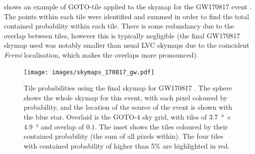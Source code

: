 \begin{colsection}
\begin{colsection}
\newpage

 shows an example of GOTO-tile applied to the skymap for the GW170817 event \citep{GW170817}. The points within each tile were identified and summed in order to find the total contained probability within each tile. There is some redundancy due to the overlap between tiles, however this is typically negligible (the final GW170817 skymap used was notably smaller than usual LVC skymaps due to the coincident \textit{Fermi} localisation, which makes the overlaps more pronounced).

\begin{figure}[p]
    \begin{center}
        \texttt{[image: images/skymaps\_170817\_gw.pdf]} %
    \end{center}
    \caption[Tile probabilities for GW170817]{
        Tile probabilities using the final skymap for GW170817 \citep{GW170817}. The sphere shows the whole skymap for this event, with each pixel coloured by probability, and the location of the source of the event is shown with the blue star. Overlaid is the GOTO-4 sky grid, with tiles of \SI{3.7}{\degree} $\times$ \SI{4.9}{\degree} and overlap of $0.1$. The inset shows the tiles coloured by their contained probability (the sum of all pixels within). The four tiles with contained probability of higher than 5\% are highlighted in red.
    }\label{fig:170817_gw}
\end{figure}

\clearpage

\end{colsection}


\end{colsection}


\newpage
